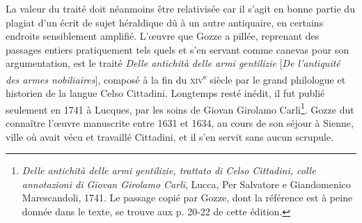 \documentclass[12pt,twoside,openany]{book}
\begin{document}
La valeur du traité doit néanmoins être relativisée car il s’agit en bonne partie du plagiat d’un écrit de sujet héraldique dû à un autre antiquaire, en certains endroits sensiblement amplifié. L’œuvre que Gozze a pillée, reprenant des passages entiers pratiquement tels quels et s’en servant comme canevas pour son argumentation, est le traité \textit{Delle antichità delle armi gentilizie }[\textit{De l’antiquité des armes nobiliaires}], composé à la fin du \textsc{xiv}\textsuperscript{e} siècle par le grand philologue et historien de la langue Celso Cittadini. Longtemps resté inédit, il fut publié seulement en 1741 à Lucques, par les soins de Giovan Girolamo Carli\footnote{\textit{Delle antichità delle armi gentilizie, trattato di Celso Cittadini, colle annotazioni di Giovan Girolamo Carli}, Lucca, Per Salvatore e Giandomenico Marescandoli, 1741. Le passage copié par Gozze, dont la référence est à peine donnée dans le texte, se trouve aux p. 20-22 de cette édition.}. Gozze dut connaître l’œuvre manuscrite entre 1631 et 1634, au cours de son séjour à Sienne, ville où avait vécu et travaillé Cittadini, et il s’en servit sans aucun scrupule.
\end{document}
